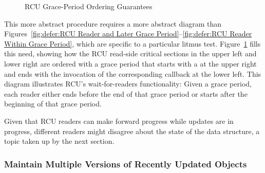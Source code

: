 \begin{figure}[tb]
\centering
{}
\caption{RCU Grace-Period Ordering Guarantees}
\label{fig:defer:RCU Grace-Period Ordering Guarantees}
\end{figure}

This more abstract procedure requires a more abstract diagram than
Figures~\ref{fig:defer:RCU Reader and Later Grace Period}--\ref{fig:defer:RCU Reader Within Grace Period},
which are specific to a particular litmus test.
Figure~\ref{fig:defer:RCU Grace-Period Ordering Guarantees}
fills this need, showing how the RCU read-side critical sections
in the upper left and lower right are ordered with a grace period
that starts with a  at the upper right and ends
with the invocation of the corresponding callback at the lower left.
This diagram illustrates RCU's wait-for-readers functionality:
Given a grace period, each reader either ends before the end of that
grace period or starts after the beginning of that grace period.

Given that RCU readers can make forward progress while updates
are in progress, different readers might disagree about the state
of the data structure, a topic taken up by the next section.

\subsubsection{Maintain Multiple Versions of Recently Updated Objects}
\label{sec:defer:Maintain Multiple Versions of Recently Updated Objects}

